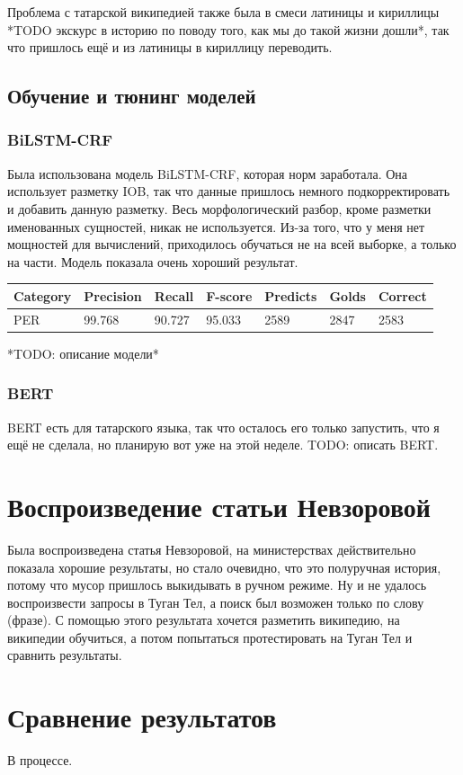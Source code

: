 Проблема с татарской википедией также была в смеси латиницы и кириллицы *TODO экскурс в историю по поводу того, как мы до такой жизни дошли*, так что пришлось ещё и из латиницы в кириллицу переводить.


\subsection{Обучение и тюнинг моделей}

\subsubsection{BiLSTM-CRF}

Была использована модель BiLSTM-CRF, которая норм заработала. Она использует разметку IOB, так что данные пришлось немного подкорректировать и добавить данную разметку. Весь морфологический разбор, кроме разметки именованных сущностей, никак не используется. Из-за того, что у меня нет мощностей для вычислений, приходилось обучаться не на всей выборке, а только на части. Модель показала очень хороший результат.

\medskip

\begin{tabular}{| l | l | l | l | l | l | l |}
\hline
Category               & Precision  &   Recall   &  F-score   &  Predicts  &   Golds    &  Correct   \\

\hline
 PER                                 & 99.768     & 90.727     & 95.033     & 2589       & 2847       & 2583       \\
\hline
\end{tabular}



*TODO: описание модели*

\subsubsection{BERT}

BERT есть для татарского языка, так что осталось его только запустить, что я ещё не сделала, но планирую вот уже на этой неделе. TODO: описать BERT.


\section{Воспроизведение статьи Невзоровой}

Была воспроизведена статья Невзоровой, на министерствах действительно показала хорошие результаты, но стало очевидно, что это полуручная история, потому что мусор пришлось выкидывать в ручном режиме. Ну и не удалось воспроизвести запросы в Туган Тел, а поиск был возможен только по слову (фразе). С помощью этого результата хочется разметить википедию, на википедии обучиться, а потом попытаться протестировать на Туган Тел и сравнить результаты.

\section{Сравнение результатов}

В процессе.



